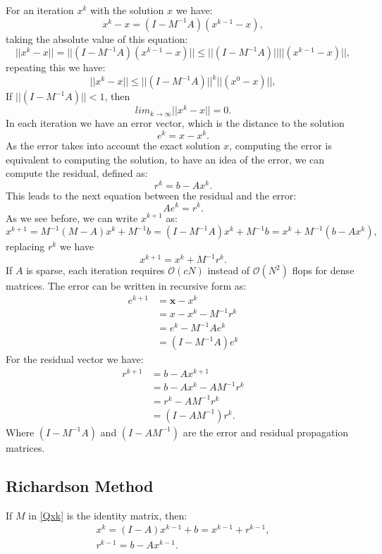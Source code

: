 \documentclass[12pt]{report}
\begin{document}
For an iteration $x^{k}$ with the solution $x$ we have:
\begin{equation*}
x^k-x=(I-M^{-1}A)(x^{k-1}-x),
\end{equation*}
taking the absolute value of this equation:
\begin{equation*}
||x^k-x||=||(I-M^{-1}A)(x^{k-1}-x)|| \leq ||(I-M^{-1}A)||||(x^{k-1}-x)||,
\end{equation*}
repeating this we have:
\begin{equation*}
||x^k-x||\leq ||(I-M^{-1}A)||^k||(x^0-x)||,
\end{equation*}
If $||(I-M^{-1}A)||<1$, then
\begin{equation*}
lim_{k \rightarrow \infty}||x^k-x||=0.
\end{equation*}
In each iteration we have an error vector, which is the distance to the solution 
$$e^k=x-x^k.$$
As the error takes into account the exact solution $x$, computing the error is equivalent to computing the 
solution, to have an idea of the error, we can compute the residual, defined as:
$$r^k=b-Ax^k.$$
This leads to the next equation between the residual and the error:
$$Ae^k=r^k.$$
As we see before, we can write $x^{k+1}$ as:
$$x^{k+1}=M^{-1}(M-A)x^k+M^{-1}b=(I-M^{-1}A)x^k+M^{-1}b=x^k+M^{-1}(b-Ax^k),$$
replacing $r^k$ we have
$$x^{k+1}=x^k+M^{-1}r^k.$$
If $A$ is sparse, each iteration requires $\mathcal{O}(cN)$ instead of $\mathcal{O}(N^2)$ flops for dense matrices.
The error can be written in recursive form as:
\begin{align*}
e^{k+1}&=\mathbf{x}-x^k\\
&=x-x^k-M^{-1}r^k\\
&=e^k-M^{-1}Ae^k\\
&=(I-M^{-1}A)e^k
\end{align*}
For the residual vector we have:
\begin{align*}
r^{k+1}&= b-Ax^{k+1}\\
&=b-Ax^k-AM^{-1}r^k\\
&=r^k-AM^{-1}r^k\\
&=(I-AM^{-1})r^k.
\end{align*}
Where $(I-M^{-1}A)$ and $(I-AM^{-1})$ are the error and residual propagation matrices.
\subsection{Richardson Method}
If $M$ in \eqref{Qxk} is the identity matrix, then:
\begin{gather*}
x^k=(I-A)x^{k-1}+b=x^{k-1}+r^{k-1}, \\
r^{k-1}=b-Ax^{k-1}.
\end{gather*}
\end{document}

